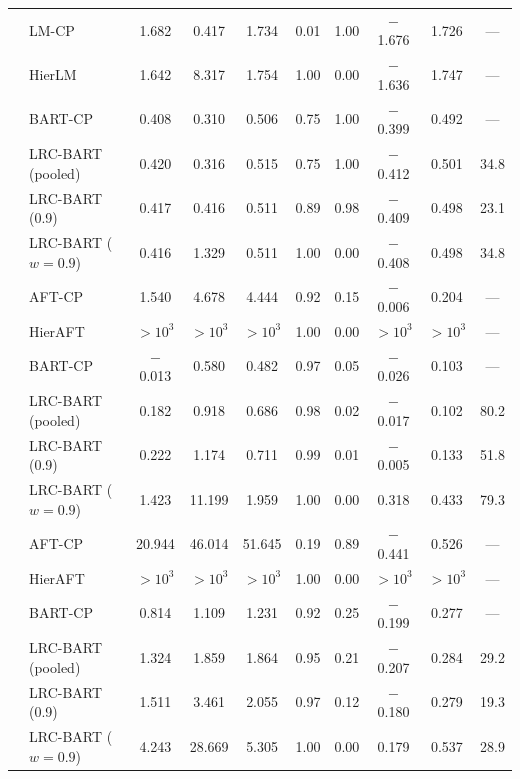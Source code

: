 \begin{longtable}{llcccccccc}
\midrule
{} & LM-CP & 1.682 & 0.417 & 1.734 & 0.01 & 1.00 & $-$1.676 & 1.726 & --- \\*
& HierLM & 1.642 & 8.317 & 1.754 & 1.00 & 0.00 & $-$1.636 & 1.747 & --- \\*
& BART-CP & 0.408 & 0.310 & 0.506 & 0.75 & 1.00 & $-$0.399 & 0.492 & --- \\*
& LRC-BART (pooled) & 0.420 & 0.316 & 0.515 & 0.75 & 1.00 & $-$0.412 & 0.501 & 34.8 \\*
& LRC-BART (0.9) & 0.417 & 0.416 & 0.511 & 0.89 & 0.98 & $-$0.409 & 0.498 & 23.1 \\*
& LRC-BART ($w=0.9$) & 0.416 & 1.329 & 0.511 & 1.00 & 0.00 & $-$0.408 & 0.498 & 34.8 \\
\midrule
{} & AFT-CP & 1.540 & 4.678 & 4.444 & 0.92 & 0.15 & $-$0.006 & 0.204 & --- \\*
& HierAFT & $>\!10^{3}$ & $>\!10^{3}$ & $>\!10^{3}$ & 1.00 & 0.00 & $>\!10^{3}$ & $>\!10^{3}$ & --- \\*
& BART-CP & $-$0.013 & 0.580 & 0.482 & 0.97 & 0.05 & $-$0.026 & 0.103 & --- \\*
& LRC-BART (pooled) & 0.182 & 0.918 & 0.686 & 0.98 & 0.02 & $-$0.017 & 0.102 & 80.2 \\*
& LRC-BART (0.9) & 0.222 & 1.174 & 0.711 & 0.99 & 0.01 & $-$0.005 & 0.133 & 51.8 \\*
& LRC-BART ($w=0.9$) & 1.423 & 11.199 & 1.959 & 1.00 & 0.00 & 0.318 & 0.433 & 79.3 \\
\midrule
{} & AFT-CP & 20.944 & 46.014 & 51.645 & 0.19 & 0.89 & $-$0.441 & 0.526 & --- \\*
& HierAFT & $>\!10^{3}$ & $>\!10^{3}$ & $>\!10^{3}$ & 1.00 & 0.00 & $>\!10^{3}$ & $>\!10^{3}$ & --- \\*
& BART-CP & 0.814 & 1.109 & 1.231 & 0.92 & 0.25 & $-$0.199 & 0.277 & --- \\*
& LRC-BART (pooled) & 1.324 & 1.859 & 1.864 & 0.95 & 0.21 & $-$0.207 & 0.284 & 29.2 \\*
& LRC-BART (0.9) & 1.511 & 3.461 & 2.055 & 0.97 & 0.12 & $-$0.180 & 0.279 & 19.3 \\*
& LRC-BART ($w=0.9$) & 4.243 & 28.669 & 5.305 & 1.00 & 0.00 & 0.179 & 0.537 & 28.9 \\

\end{longtable}

